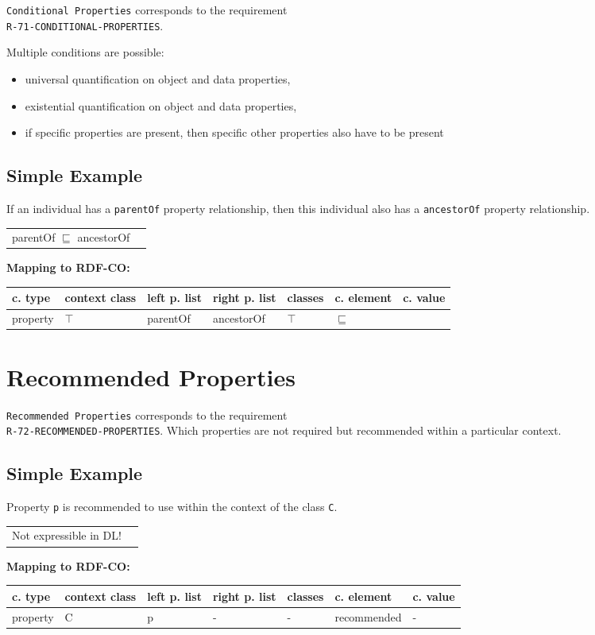 \documentclass{llncs}
\newcommand{\ms}[1]{\texttt{#1}}
\newenvironment{gcotable}{
  \scriptsize
  \sffamily
  \vspace{0cm}
	\begin{center}
	\textbf{\vspace{0.4cm}Mapping to RDF-CO:} \\
  \begin{tabular}{l|l|l|l|l|l|l}
	\hline
  \textbf{c. type} & \textbf{context class} & \textbf{left p. list} & \textbf{right p. list} & \textbf{classes} & \textbf{c. element} & \textbf{c. value} \\
  \hline

}{
  \hline
  \end{tabular}
	\end{center}
}
\newenvironment{DL}{
  \vspace{0cm}
	\begin{center}
  \begin{tabular}{r l}

}{
  \end{tabular}
	\end{center}
}
\begin{document}
\ms{Conditional Properties} corresponds to the requirement \\
\ms{R-71-CONDITIONAL-PROPERTIES}.

Multiple conditions are possible:

\begin{itemize}
  \item universal quantification on object and data properties,
  \item existential quantification on object and data properties,
  \item if specific properties are present, then specific other properties also have to be present
\end{itemize}

\subsection{Simple Example}

If an individual has a \ms{parentOf} property relationship, then this individual also has a \ms{ancestorOf} property relationship.

\begin{DL}
parentOf $\sqsubseteq$ ancestorOf 
\end{DL}

\begin{gcotable}
property & $\top$ & parentOf & ancestorOf & $\top$ & $\sqsubseteq$ \\
\end{gcotable}

\section{Recommended Properties}

\ms{Recommended Properties} corresponds to the requirement \\
\ms{R-72-RECOMMENDED-PROPERTIES}.
Which properties are not required but recommended within a particular context.

\subsection{Simple Example}

Property \ms{p} is recommended to use within the context of the class \ms{C}.

\begin{DL}
Not expressible in DL!
\end{DL}

\begin{gcotable}
property & C & p & - & - & recommended & - \\
\end{gcotable}
\end{document}
